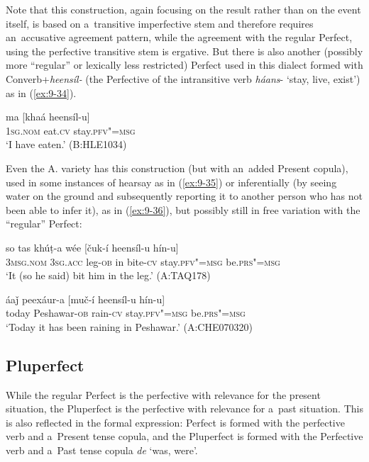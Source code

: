 Note that this construction, again focusing on the result rather than on the event itself, is based on a~transitive imperfective stem and therefore requires an~accusative agreement pattern, while the agreement with the regular Perfect, using the perfective transitive stem is ergative. But there is also another (possibly more ``regular'' or lexically less restricted) Perfect used in this dialect formed with Converb+\textit{heensíl-} (the Perfective of the intransitive verb \textit{háans}- `stay, live, exist') as in (\ref{ex:9-34}).

\begin{exe}
\ex
\label{ex:9-34}
\gll ma [khaá heensíl-u]  \\
\textsc{1sg.nom} eat.\textsc{cv} stay.\textsc{pfv"=msg} \\
\glt `I have eaten.' (B:HLE1034)
\end{exe}

Even the A. variety has this construction (but with an~added Present copula), used in some instances of hearsay as in (\ref{ex:9-35}) or inferentially (by seeing water on the ground and subsequently reporting it to another person who has not been able to infer it), as in (\ref{ex:9-36}), but possibly still in free variation with the ``regular'' Perfect:

\begin{exe}
\ex
\label{ex:9-35}
\gll so tas khúṭ-a wée [čuk-í heensíl-u hín-u] \\
\textsc{3msg.nom} \textsc{3sg.acc} leg-\textsc{ob} in bite-\textsc{cv} stay.\textsc{pfv"=msg} be.\textsc{prs"=msg} \\
\glt `It (so he said) bit him in the leg.' (A:TAQ178)

\ex
\label{ex:9-36}
\gll áaǰ peexáur-a [muč-í heensíl-u hín-u]  \\
today Peshawar-\textsc{ob} rain-\textsc{cv} stay.\textsc{pfv"=msg} be.\textsc{prs"=msg} \\
\glt `Today it has been raining in Peshawar.' (A:CHE070320)
\end{exe}

\subsection{Pluperfect}
\label{subsec:9-1-8}

While the regular Perfect is the perfective with relevance for the present situation, the Pluperfect is the perfective with relevance for a~past situation. This is also reflected in the formal expression: Perfect is formed with the perfective verb and a~Present tense copula, and the Pluperfect is formed with the Perfective verb and a~Past tense copula \textit{de} `was, were'. 


